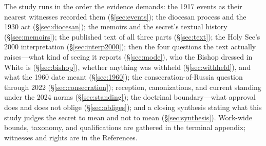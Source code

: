 The study runs in the order the evidence demands: the 1917 events as
their nearest witnesses recorded them (\S\ref{sec:events}); the
diocesan process and the 1930 act (\S\ref{sec:diocesan}); the memoirs
and the secret's textual history (\S\ref{sec:memoirs}); the published
text of all three parts (\S\ref{sec:text}); the Holy See's 2000
interpretation (\S\ref{sec:interp2000}); then the four questions the
text actually raises---what kind of seeing it reports
(\S\ref{sec:mode}), who the Bishop dressed in White is
(\S\ref{sec:bishop}), whether anything was withheld
(\S\ref{sec:withheld}), and what the 1960 date meant
(\S\ref{sec:1960}); the consecration-of-Russia question through 2022
(\S\ref{sec:consecration}); reception, canonizations, and current
standing under the 2024 norms (\S\ref{sec:standing}); the doctrinal
boundary---what approval does and does not oblige
(\S\ref{sec:obliges}); and a closing synthesis stating what this
study judges the secret to mean and not to mean
(\S\ref{sec:synthesis}). Work-wide bounds, taxonomy, and
qualifications are gathered in the terminal appendix; witnesses and
rights are in the References.
